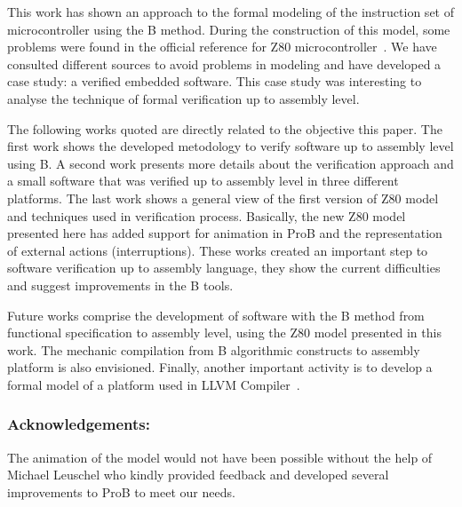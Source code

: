 \documentclass[a4paper]{llncs}
\begin{document}
This work has shown an approach to the formal modeling of the instruction set of
microcontroller using the B method.  During the construction of this model, some
problems were found in the official reference for Z80
microcontroller~\cite{Z80_manual}. We have consulted different sources \cite{Simulator_z80,UndocumentedZ80,Z80_manual}  to avoid problems in modeling and have developed a case study: a verified embedded software.
This case study was interesting to analyse the technique of formal verification up to assembly level. 

The following works quoted are directly related to the objective this paper.
The first work \cite{DantasSemish2008} shows the developed metodology to verify
software up to assembly level using B. A second work\cite{Dantas_SBMF08}
presents more details about the verification approach and a small 
software that was verified up to assembly level in three different platforms. 
The last work \cite{Valerio_SBMF09} shows a general view of the first version of Z80
model and techniques used in verification process. Basically, the new Z80 model presented here has added support for animation in ProB and the representation of external actions (interruptions).
These works created an important step to software verification up to assembly
language, they show the current difficulties and suggest improvements in the
B tools. 





Future works comprise the development of software with the B method from
functional specification to assembly level, using the Z80 model presented in this
work. The mechanic compilation from B algorithmic constructs to assembly platform
is also envisioned. Finally, another important activity is to develop a formal
model of a platform used in LLVM Compiler~\cite{DBLP:conf/cgo/LattnerA04}.



\subsubsection{Acknowledgements:} The animation of the model would not
have been possible without the help of Michael Leuschel who kindly
provided feedback and developed several improvements to ProB to meet our
needs.
\end{document}
